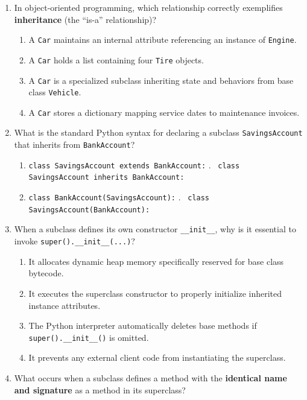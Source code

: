 \documentclass[11pt,a4paper]{article}
\begin{document}
\begin{enumerate}[label=\textbf{Q\arabic*.},leftmargin=2em,itemsep=1.5pt,topsep=1pt]
\item In object-oriented programming, which relationship correctly exemplifies \textbf{inheritance} (the ``is-a'' relationship)?
\begin{enumerate}[label=\Alph*.,leftmargin=2em]
\item A \texttt{Car} maintains an internal attribute referencing an instance of \texttt{Engine}.
\item A \texttt{Car} holds a list containing four \texttt{Tire} objects.
\item A \texttt{Car} is a specialized subclass inheriting state and behaviors from base class \texttt{Vehicle}.
\item A \texttt{Car} stores a dictionary mapping service dates to maintenance invoices.
\end{enumerate}
\item What is the standard Python syntax for declaring a subclass \texttt{SavingsAccount} that inherits from \texttt{BankAccount}?
\begin{enumerate}[label=\Alph*.,leftmargin=2em]
\item \texttt{class SavingsAccount extends BankAccount:} \quad \Alph*.~ \texttt{class SavingsAccount inherits BankAccount:}
\item \texttt{class BankAccount(SavingsAccount):} \quad \Alph*.~ \texttt{class SavingsAccount(BankAccount):}
\end{enumerate}
\item When a subclass defines its own constructor \texttt{\_\_init\_\_}, why is it essential to invoke \texttt{super().\_\_init\_\_(...)}?
\begin{enumerate}[label=\Alph*.,leftmargin=2em]
\item It allocates dynamic heap memory specifically reserved for base class bytecode.
\item It executes the superclass constructor to properly initialize inherited instance attributes.
\item The Python interpreter automatically deletes base methods if \texttt{super().\_\_init\_\_()} is omitted.
\item It prevents any external client code from instantiating the superclass.
\end{enumerate}
\item What occurs when a subclass defines a method with the \textbf{identical name and signature} as a method in its superclass?

\end{enumerate}
\end{document}
